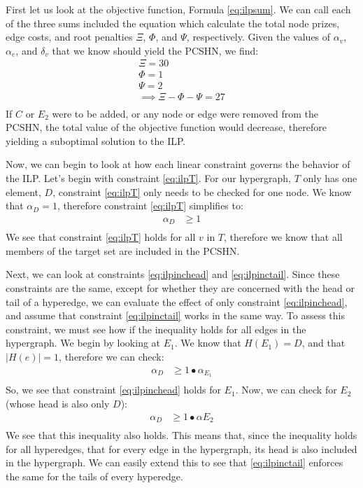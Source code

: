 \documentclass[12pt,twoside]{reedthesis}
\theoremstyle{definition}
\begin{document}
First let us look at the objective function, Formula \eqref{eq:ilpsum}. We can call each of the three sums included the equation which calculate the total node prizes, edge costs, and root penalties $\Xi$, $\Phi$, and $\Psi$, respectively. Given the values of $\alpha_v$, $\alpha_e$, and $\delta_v$ that we know should yield the PCSHN, we find:
\begin{gather*}
 \Xi = 30\\
 \Phi = 1\\
 \Psi = 2\\
 \implies \Xi - \Phi - \Psi = 27\\
\end{gather*}%
If $C$ or $E_2$ were to be added, or any node or edge were removed from the PCSHN, the total value of the objective function would decrease, therefore yielding a suboptimal solution to the ILP.\par

Now, we can begin to look at how each linear constraint governs the behavior of the ILP. Let's begin with constraint \eqref{eq:ilpT}. For our hypergraph, $T$ only has one element, $D$, constraint \eqref{eq:ilpT} only needs to be checked for one node. We know that $\alpha_D = 1$, therefore constraint \eqref{eq:ilpT} simplifies to:
\begin{align*}
  \alpha_D &\geq 1\\
\end{align*}
We see that constraint \eqref{eq:ilpT} holds for all $v$ in $T$, therefore we know that all members of the target set are included in the PCSHN.\par

Next, we can look at constraints \eqref{eq:ilpinchead} and \eqref{eq:ilpinctail}. Since these constraints are the same, except for whether they are concerned with the head or tail of a hyperedge, we can evaluate the effect of only constraint \eqref{eq:ilpinchead}, and assume that constraint \eqref{eq:ilpinctail} works in the same way. To assess this constraint, we must see how if the inequality holds for all edges in the hypergraph. We begin by looking at $E_1$. We know that $H({E_1})=D$, and that $\lvert H(e) \rvert = 1$, therefore we can check:
\begin{align*}
  \alpha_D &\geq 1 \bullet \alpha_{E_1}\\
\end{align*}%
So, we see that constraint \eqref{eq:ilpinchead} holds for $E_1$. Now, we can check for $E_2$ (whose head is also only $D$):
\begin{align*}
  \alpha_D &\geq 1 \bullet \alpha{E_2}\\
\end{align*}%
We see that this inequality also holds. This means that, since the inequality holds for all hyperedges, that for every edge in the hypergraph, its head is also included in the hypergraph. We can easily extend this to see that \eqref{eq:ilpinctail} enforces the same for the tails of every hyperedge.\par
\end{document}

